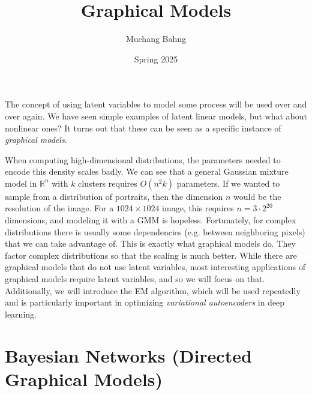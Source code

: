 \documentclass{article}
\begin{document}

\title{Graphical Models}
\author{Muchang Bahng}
\date{Spring 2025}

\maketitle
\tableofcontents
\pagebreak

  The concept of using latent variables to model some process will be used over and over again. We have seen simple examples of latent linear models, but what about nonlinear ones? It turns out that these can be seen as a specific instance of \textit{graphical models}. 

  When computing high-dimensional distributions, the parameters needed to encode this density scales badly. We can see that a general Gaussian mixture model in $\mathbb{R}^n$ with $k$ clusters requires $O(n^2 k)$ parameters. If we wanted to sample from a distribution of portraits, then the dimension $n$ would be the resolution of the image. For a $1024 \times 1024$ image, this requires $n = 3 \cdot 2^{20}$ dimensions, and modeling it with a GMM is hopeless. Fortunately, for complex distributions there is usually some dependencies (e.g. between neighboring pixels) that we can take advantage of. This is exactly what graphical models do. They factor complex distributions so that the scaling is much better. While there are graphical models that do not use latent variables, most interesting applications of graphical models require latent variables, and so we will focus on that. Additionally, we will introduce the EM algorithm, which will be used repeatedly and is particularly important in optimizing \textit{variational autoencoders} in deep learning. 

\section{Bayesian Networks (Directed Graphical Models)} 
\end{document}
